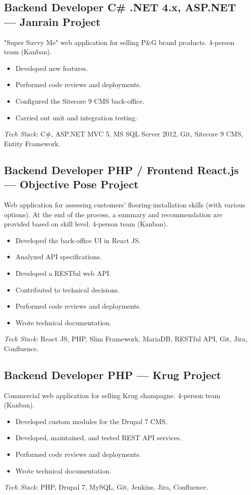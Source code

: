 \documentclass[10pt,a4paper]{article}
\begin{document}
\vspace{6pt}

\subsection*{Backend Developer C\# .NET 4.x, ASP.NET --- Janrain Project}
\color{darkgray}
"Super Savvy Me" web application for selling P\&G brand products. 4-person team (Kanban).
\begin{itemize}
  \item Developed new features.
  \item Performed code reviews and deployments.
  \item Configured the Sitecore 9 CMS back-office.
  \item Carried out unit and integration testing.
\end{itemize}
\textit{Tech Stack:} C\#, ASP.NET MVC 5, MS SQL Server 2012, Git, Sitecore 9 CMS, Entity Framework.

\vspace{6pt}

\subsection*{Backend Developer PHP / Frontend React.js --- Objective Pose Project}
\color{darkgray}
Web application for assessing customers' flooring-installation skills (with various options). At the end of the process, a summary and recommendation are provided based on skill level. 4-person team (Kanban).
\begin{itemize}
  \item Developed the back-office UI in React JS.
  \item Analyzed API specifications.
  \item Developed a RESTful web API.
  \item Contributed to technical decisions.
  \item Performed code reviews and deployments.
  \item Wrote technical documentation.
\end{itemize}
\textit{Tech Stack:} React JS, PHP, Slim Framework, MariaDB, RESTful API, Git, Jira, Confluence.

\vspace{6pt}

\subsection*{Backend Developer PHP --- Krug Project}
\color{darkgray}
Commercial web application for selling Krug champagne. 4-person team (Kanban).
\begin{itemize}
  \item Developed custom modules for the Drupal 7 CMS.
  \item Developed, maintained, and tested REST API services.
  \item Performed code reviews and deployments.
  \item Wrote technical documentation.
\end{itemize}
\textit{Tech Stack:} PHP, Drupal 7, MySQL, Git, Jenkins, Jira, Confluence.
\end{document}

